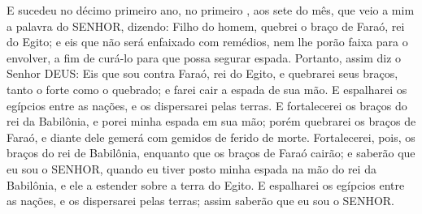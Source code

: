 {E sucedeu no décimo primeiro ano, no primeiro
{} , aos sete do mês, que veio a mim a palavra do SENHOR, dizendo:
Filho do homem, quebrei o braço de Faraó, rei do Egito; e eis que não será enfaixado com remédios, nem lhe porão faixa para o envolver, a fim de curá-lo para que possa segurar espada.
Portanto, assim diz o Senhor DEUS: Eis que sou contra Faraó, rei do Egito, e quebrarei seus braços, tanto o forte como o quebrado; e farei cair a espada de sua mão.
E espalharei os egípcios entre as nações, e os dispersarei pelas terras.
E fortalecerei os braços do rei da Babilônia, e porei minha espada em sua mão; porém quebrarei os braços de Faraó, e diante dele gemerá com gemidos de ferido de morte.
Fortalecerei, pois, os braços do rei de Babilônia, enquanto que os braços de Faraó cairão; e saberão que eu sou o SENHOR, quando eu tiver posto minha espada na mão do rei da Babilônia, e ele a estender sobre a terra do Egito.
E espalharei os egípcios entre as nações, e os dispersarei pelas terras; assim saberão que eu sou o SENHOR.

}
